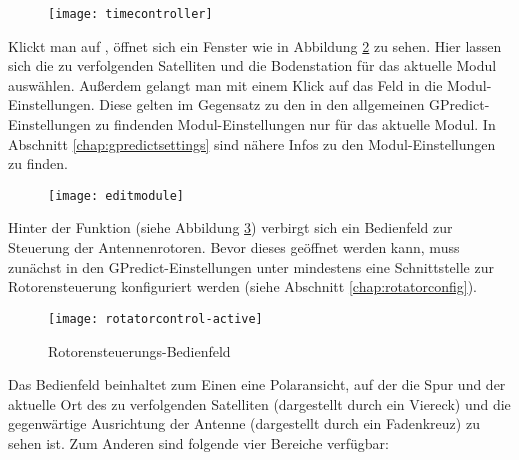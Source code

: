 \begin{figure}[h]
	\centering
	\texttt{[image: timecontroller]}
	\caption{}
	\label{fig:timecontroller} 
\end{figure}

Klickt man auf , öffnet sich ein Fenster wie in Abbildung \ref{fig:editmodule} zu sehen. Hier lassen sich die zu verfolgenden Satelliten und die Bodenstation für das aktuelle Modul auswählen. Außerdem gelangt man mit einem Klick auf das Feld  in die Modul-Einstellungen. Diese gelten im Gegensatz zu den in den allgemeinen GPredict-Einstellungen zu findenden Modul-Einstellungen nur für das aktuelle Modul. In Abschnitt \ref{chap:gpredictsettings} sind nähere Infos zu den Modul-Einstellungen zu finden.
\label{modulesettingsspecific}

\begin{figure}[h]
	\centering
	\texttt{[image: editmodule]}
	\caption{}
	\label{fig:editmodule} 
\end{figure}

\clearpage

Hinter der Funktion  (siehe Abbildung \ref{fig:rotatorcontrol}) verbirgt sich ein Bedienfeld zur Steuerung der Antennenrotoren. Bevor dieses geöffnet werden kann, muss zunächst in den GPredict-Einstellungen unter  mindestens eine Schnittstelle zur Rotorensteuerung konfiguriert werden (siehe Abschnitt \ref{chap:rotatorconfig}). 
\begin{figure}[h]
	\centering
	\texttt{[image: rotatorcontrol-active]}
	\caption{Rotorensteuerungs-Bedienfeld}
	\label{fig:rotatorcontrol} 
\end{figure}

Das Bedienfeld beinhaltet zum Einen eine Polaransicht, auf der die Spur und der aktuelle Ort des zu verfolgenden Satelliten (dargestellt durch ein Viereck) und die gegenwärtige Ausrichtung der Antenne (dargestellt durch ein Fadenkreuz) zu sehen ist. Zum Anderen sind folgende vier Bereiche verfügbar:

